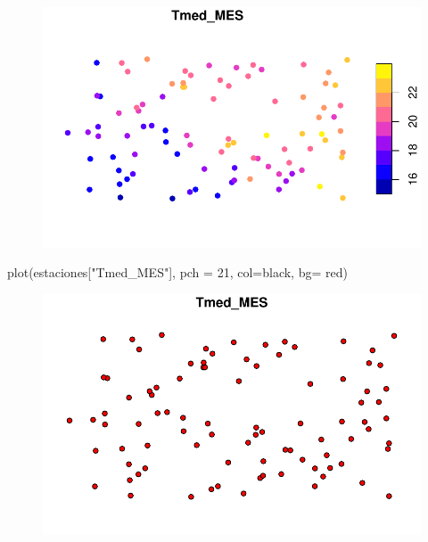 \documentclass[
  letterpaper,
  DIV=11,
  numbers=noendperiod]{scrreprt}
\newenvironment{Shaded}{\begin{snugshade}}{\end{snugshade}}
\newcommand{\AttributeTok}[1]{\textcolor[rgb]{0.40,0.45,0.13}{#1}}
\newcommand{\DecValTok}[1]{\textcolor[rgb]{0.68,0.00,0.00}{#1}}
\newcommand{\FunctionTok}[1]{\textcolor[rgb]{0.28,0.35,0.67}{#1}}
\newcommand{\NormalTok}[1]{\textcolor[rgb]{0.00,0.23,0.31}{#1}}
\newcommand{\StringTok}[1]{\textcolor[rgb]{0.13,0.47,0.30}{#1}}
\begin{document}
\begin{figure}[H]

{\centering \includegraphics{03_DatosEspaciales_files/figure-pdf/unnamed-chunk-9-1.pdf}

}

\end{figure}

\begin{Shaded}
\begin{Highlighting}[]
\FunctionTok{plot}\NormalTok{(estaciones[}\StringTok{"Tmed\_MES"}\NormalTok{], }\AttributeTok{pch =} \DecValTok{21}\NormalTok{, }\AttributeTok{col=}\StringTok{\textquotesingle{}black\textquotesingle{}}\NormalTok{, }\AttributeTok{bg=} \StringTok{\textquotesingle{}red\textquotesingle{}}\NormalTok{)}
\end{Highlighting}
\end{Shaded}

\begin{figure}[H]

{\centering \includegraphics{03_DatosEspaciales_files/figure-pdf/unnamed-chunk-9-2.pdf}

}

\end{figure}
\end{document}

